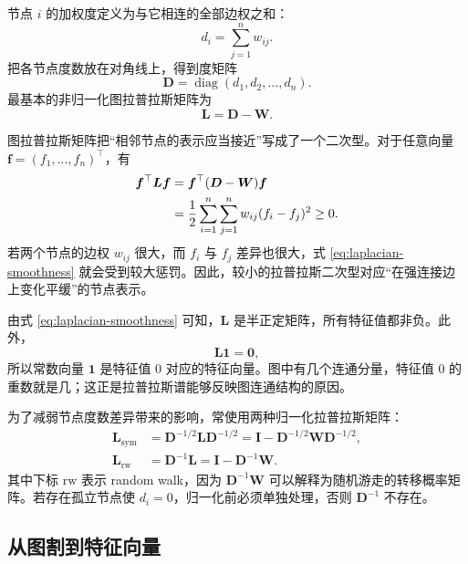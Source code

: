 \documentclass[UTF8,zihao=-4,openany]{ctexbook}
\begin{document}
节点 \(i\) 的加权度定义为与它相连的全部边权之和：
\begin{equation}
  d_i=\sum_{j=1}^{n}w_{ij}.
  \label{eq:graph-degree}
\end{equation}
把各节点度数放在对角线上，得到度矩阵
\[
  \boldsymbol D
  =
  \operatorname{diag}(d_1,d_2,\ldots,d_n).
\]
最基本的非归一化图拉普拉斯矩阵为
\begin{equation}
  \boldsymbol L
  =
  \boldsymbol D-\boldsymbol W.
  \label{eq:unnormalized-laplacian}
\end{equation}

图拉普拉斯矩阵把“相邻节点的表示应当接近”写成了一个二次型。对于任意向量
\(
\boldsymbol f=(f_1,\ldots,f_n)^\top
\)，有
\begin{align}
  \boldsymbol f^\top\boldsymbol L\boldsymbol f
  &=
  \boldsymbol f^\top(\boldsymbol D-\boldsymbol W)\boldsymbol f \notag\\
  &=
  \frac{1}{2}
  \sum_{i=1}^{n}\sum_{j=1}^{n}
  w_{ij}(f_i-f_j)^2
  \geq0.
  \label{eq:laplacian-smoothness}
\end{align}
若两个节点的边权 \(w_{ij}\) 很大，而 \(f_i\) 与 \(f_j\) 差异也很大，式 \eqref{eq:laplacian-smoothness} 就会受到较大惩罚。因此，较小的拉普拉斯二次型对应“在强连接边上变化平缓”的节点表示。

由式 \eqref{eq:laplacian-smoothness} 可知，\(\boldsymbol L\) 是半正定矩阵，所有特征值都非负。此外，
\[
  \boldsymbol L\boldsymbol 1=\boldsymbol 0,
\]
所以常数向量 \(\boldsymbol 1\) 是特征值 \(0\) 对应的特征向量。图中有几个连通分量，特征值 \(0\) 的重数就是几；这正是拉普拉斯谱能够反映图连通结构的原因。

为了减弱节点度数差异带来的影响，常使用两种归一化拉普拉斯矩阵：
\begin{align}
  \boldsymbol L_{\mathrm{sym}}
  &=
  \boldsymbol D^{-1/2}\boldsymbol L\boldsymbol D^{-1/2}
  =
  \boldsymbol I-\boldsymbol D^{-1/2}\boldsymbol W\boldsymbol D^{-1/2},
  \label{eq:symmetric-normalized-laplacian}\\
  \boldsymbol L_{\mathrm{rw}}
  &=
  \boldsymbol D^{-1}\boldsymbol L
  =
  \boldsymbol I-\boldsymbol D^{-1}\boldsymbol W.
  \label{eq:random-walk-laplacian}
\end{align}
其中下标 \(\mathrm{rw}\) 表示 random walk，因为 \(\boldsymbol D^{-1}\boldsymbol W\) 可以解释为随机游走的转移概率矩阵。若存在孤立节点使 \(d_i=0\)，归一化前必须单独处理，否则 \(\boldsymbol D^{-1}\) 不存在。

\subsection{从图割到特征向量}
\end{document}
